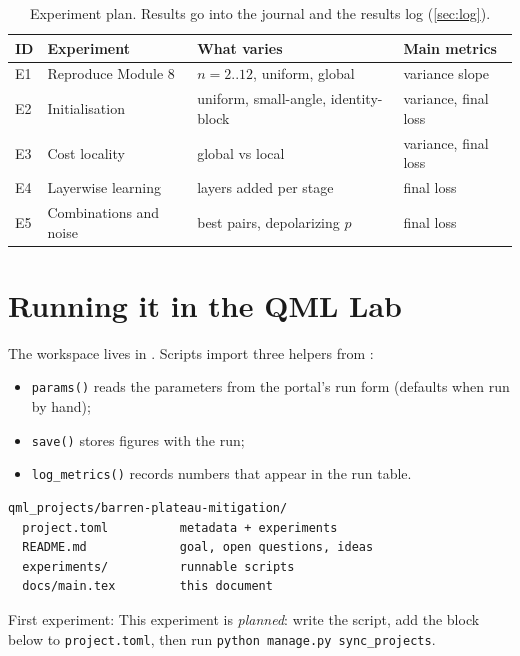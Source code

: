 \documentclass[11pt,a4paper]{article}
\begin{document}
\begin{table}[h]
\centering\small
\begin{tabularx}{\linewidth}{@{}l>{\raggedright}X>{\raggedright}X>{\raggedright\arraybackslash}X@{}}
\toprule
ID & Experiment & What varies & Main metrics \\
\midrule
  E1 & Reproduce Module 8 & $n=2..12$, uniform, global & variance slope \\
  E2 & Initialisation & uniform, small-angle, identity-block & variance, final loss \\
  E3 & Cost locality & global vs local & variance, final loss \\
  E4 & Layerwise learning & layers added per stage & final loss \\
  E5 & Combinations and noise & best pairs, depolarizing $p$ & final loss \\
\bottomrule
\end{tabularx}
\caption{Experiment plan. Results go into the journal and the results log (\cref{sec:log}).}
\end{table}

\section{Running it in the QML Lab}
The workspace lives in . Scripts import three helpers from
:
\begin{itemize}
  \item \texttt{params()} reads the parameters from the portal's run form (defaults when run by hand);
  \item \texttt{save()} stores figures with the run;
  \item \texttt{log\_metrics()} records numbers that appear in the run table.
\end{itemize}

\begin{lstlisting}
qml_projects/barren-plateau-mitigation/
  project.toml          metadata + experiments
  README.md             goal, open questions, ideas
  experiments/          runnable scripts
  docs/main.tex         this document
\end{lstlisting}

First experiment: This experiment is \emph{planned}: write the script, add the block below to \texttt{project.toml}, then run \texttt{python manage.py sync\_projects}.
\end{document}
